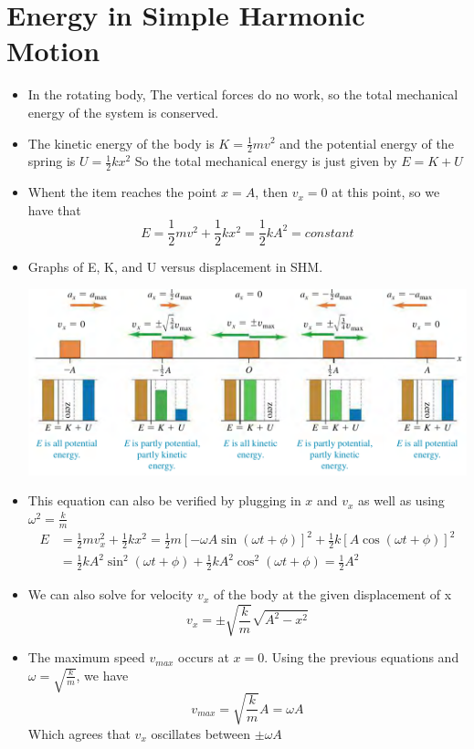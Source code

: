 \documentclass[11pt, a4paper]{article}
\begin{document}
\section{Energy in Simple Harmonic Motion}
\begin{itemize}
    \item In the rotating body, The vertical forces do no work, so the total mechanical energy of the
        system is conserved.
    \item The kinetic energy of the body is $K = \frac{1}{2}mv^{2}$ and the potential energy of the
    spring is $U = \frac{1}{2}kx^{2}$ So the total mechanical energy is just given by $E = K + U$
    \item Whent the item reaches the point $x = A$, then $v_x = 0$ at this point, so we have that
        \begin{equation}
            E = \frac{1}{2}mv^2 + \frac{1}{2}kx^2 = \frac{1}{2}kA^2 = constant
        \end{equation}
    \item Graphs of E, K, and U versus displacement in SHM.

\includegraphics[scale=0.65]{images/eku_plots.png}

    \item This equation can also be verified by plugging in $x$ and $v_x$ as well as using
        $\omega^{2} = \frac{k}{m}$
        \begin{align*}
            E &= \frac{1}{2}mv_{x}^{2} + \frac{1}{2}kx^{2} = \frac{1}{2}m[-\omega
            A\sin(\omega{}t + \phi)]^2 + \frac{1}{2}k[A\cos(\omega{}t + \phi)]^{2}\\
              &= \frac{1}{2}kA^{2}\sin^{2}(\omega t + \phi) + \frac{1}{2}kA^{2}\cos^{2}(
            \omega{}t + \phi) = \frac{1}{2}A^{2}
        \end{align*}
    \item We can also solve for velocity $v_x$ of the body at the given displacement of x
        \begin{equation}
            v_x = \pm \sqrt{\frac{k}{m}}\sqrt{A^{2}-x^{2}}
        \end{equation}
    \item The maximum speed $v_{max}$ occurs at $x = 0$. Using the previous equations and
        $\omega = \sqrt{\frac{k}{m}}$, we have
            \begin{equation}
                v_{max} = \sqrt{\frac{k}{m}}A = \omega{}A
            \end{equation}
            Which agrees that $v_x$ oscillates between $\pm\omega{}A$
\end{itemize}
\end{document}
